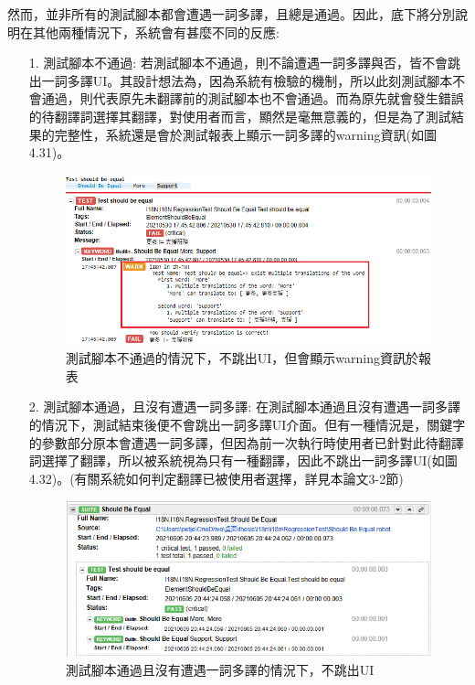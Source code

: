 然而，並非所有的測試腳本都會遭遇一詞多譯，且總是通過。因此，底下將分別說明在其他兩種情況下，系統會有甚麼不同的反應:

\begin{itemize}
\item[1.]測試腳本不通過:
若測試腳本不通過，則不論遭遇一詞多譯與否，皆不會跳出一詞多譯UI。其設計想法為，因為系統有檢驗的機制，所以此刻測試腳本不會通過，則代表原先未翻譯前的測試腳本也不會通過。而為原先就會發生錯誤的待翻譯詞選擇其翻譯，對使用者而言，顯然是毫無意義的，但是為了測試結果的完整性，系統還是會於測試報表上顯示一詞多譯的warning資訊(如圖4.31)。
\begin{figure}[H]
\includegraphics[width= \textwidth]{../論文截圖/4-3-6 測試腳本fail，不跳UI.png}
\caption{測試腳本不通過的情況下，不跳出UI，但會顯示warning資訊於報表}
\end{figure}
\item[2.]測試腳本通過，且沒有遭遇一詞多譯: 
在測試腳本通過且沒有遭遇一詞多譯的情況下，測試結束後便不會跳出一詞多譯UI介面。但有一種情況是，關鍵字的參數部分原本會遭遇一詞多譯，但因為前一次執行時使用者已針對此待翻譯詞選擇了翻譯，所以被系統視為只有一種翻譯，因此不跳出一詞多譯UI(如圖4.32)。(有關系統如何判定翻譯已被使用者選擇，詳見本論文3-2節)
\begin{figure}[H]
\includegraphics[width= \textwidth]{../論文截圖/4-3-7 測試腳本pass且沒一詞多譯，不跳UI.png}
\caption{測試腳本通過且沒有遭遇一詞多譯的情況下，不跳出UI}
\end{figure}
\end{itemize}

